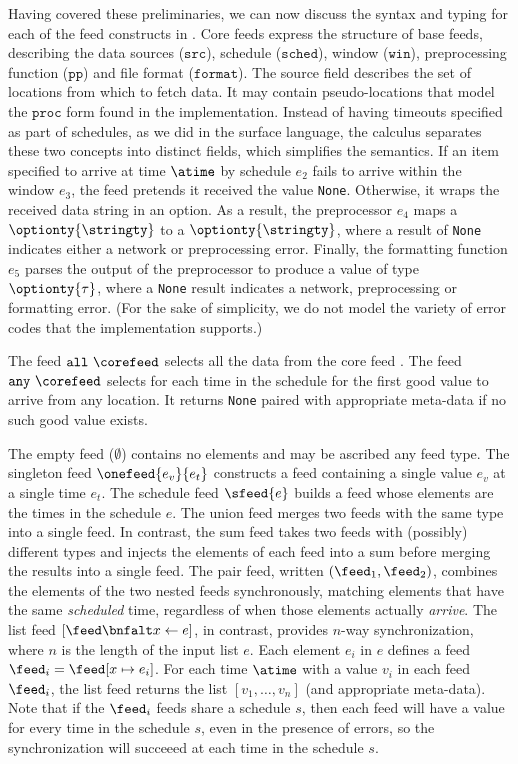 Having covered these preliminaries, 
we can now discuss the syntax and typing for
each of the feed constructs in . 
Core feeds express the structure of base feeds, describing
the data sources ($\mathtt{src}$), schedule ($\mathtt{sched}$), window
($\mathtt{win}$), preprocessing function ($\mathtt{pp}$) and file
format ($\mathtt{format}$).  The source field describes the set of
locations from which to fetch data.  It may contain
pseudo-locations that model the $\mathtt{proc}$ form found in the
implementation.  Instead of having timeouts specified as part of
schedules, as we did in the surface language, the calculus separates
these two concepts into distinct fields, which simplifies the semantics.
If an item specified to arrive at time $\atime$ by schedule $e_2$ fails
to arrive within the window $e_3$, the feed pretends it received the
value \texttt{None}.  Otherwise, it wraps the received data string in
an option. As a result, the preprocessor $e_4$ maps a $\optionty{\stringty}$
to a $\optionty{\stringty}$, where a result of \texttt{None} indicates
either a network or preprocessing error.  Finally, the formatting
function $e_5$ parses the output of the preprocessor to produce a 
value of type $\optionty{\tau}$, where a \texttt{None} result
indicates a network, preprocessing or formatting error. (For the sake
of simplicity, we do not model the variety of error codes that the
implementation supports.)  

The feed $\mathtt{all}\ \corefeed$ selects all the data from the core
feed \corefeed.  The feed $\mathtt{any}\ \corefeed$ selects for each
time in the schedule for \corefeed{} the first good value to arrive
from any location.  It returns \texttt{None} paired with appropriate
meta-data if no such good value exists.

The empty feed ($\emptyset$) contains no elements and may be ascribed
any feed type.  The singleton feed $\onefeed{e_v}{e_t}$
constructs a feed containing a single value $e_v$ at a single time
$e_t$.  The schedule feed $\sfeed{e}$ builds a feed whose elements 
are the times in the schedule $e$.
The union feed merges two feeds with the same type
into a single feed.  In contrast, the sum feed takes two feeds
with (possibly) different types and injects the elements of each feed
into a sum before merging the results into a single feed.  
The pair feed, written $(\feed_1, \feed_2)$, combines the elements of
the two nested feeds synchronously, matching elements that have the
same {\em scheduled} time, regardless of when those elements
actually {\em arrive}.
The list feed $[\feed \bnfalt x \leftarrow e ]$, in contrast, provides
$n$-way synchronization, where $n$ is the length of the input list
$e$.  Each element $e_i$ in $e$ defines a feed $\feed_i = \feed[x \mapsto e_i]$.
For each time $\atime$ with a value $v_i$ in each feed $\feed_i$, the
list feed returns the list $[v_1, \ldots, v_n]$ (and appropriate meta-data).  Note that if the
$\feed_i$ feeds share a schedule $s$, then each feed will have a value
for every time in the schedule $s$, even in the presence of errors, so
the synchronization will succeeed at each time in the schedule $s$.


